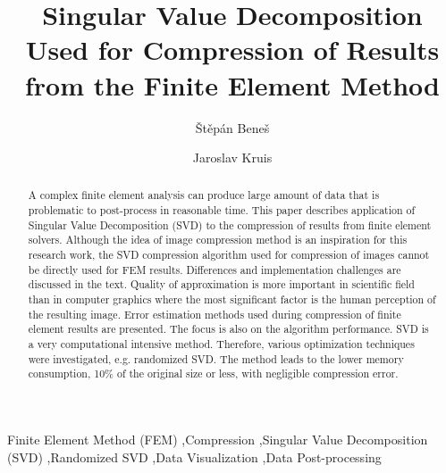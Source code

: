 \documentclass[preprint,12pt]{elsarticle}
\begin{document}
\begin{frontmatter}


\title{Singular Value Decomposition Used for Compression of Results from the Finite Element Method}

\author{\v{S}t\v{e}p\'{a}n Bene\v{s}} %
\author{Jaroslav Kruis}

\address{Department of Mechanics, Faculty of Civil Engineering, Czech Technical University in Prague Th\'akurova 7, Prague 166 29, Czech Republic}

\begin{abstract}
A complex finite element analysis can produce large amount of data that is problematic to post-process in reasonable time. This paper describes application of Singular Value Decomposition (SVD) to the compression of results from finite element solvers. Although the idea of image compression method is an inspiration for this research work, the SVD compression algorithm used for compression of images cannot be directly used for FEM results. Differences and implementation challenges are discussed in the text. Quality of approximation is more important in scientific field than in computer graphics where the most significant factor is the human perception of the resulting image. Error estimation methods used during compression of finite element results are presented. The focus is also on the algorithm performance. SVD is a very computational intensive method. Therefore, various optimization techniques were investigated, e.g. randomized SVD. The method leads to the lower memory consumption, 10\% of the original size or less, with negligible compression error.
\end{abstract}

\begin{keyword}
Finite Element Method (FEM) \sep Compression \sep Singular Value Decomposition (SVD) \sep Randomized SVD \sep Data Visualization \sep Data Post-processing
\end{keyword}

\end{frontmatter}

\end{document}
